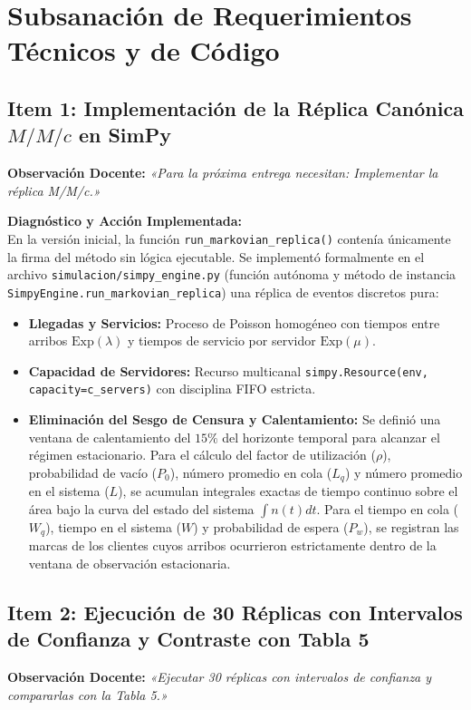 \documentclass[11pt,letterpaper]{article}
\begin{document}
\hrulefill

\section{Subsanación de Requerimientos Técnicos y de Código}

\subsection{Item 1: Implementación de la Réplica Canónica $M/M/c$ en SimPy}
\noindent \textbf{Observación Docente:} \textit{«Para la próxima entrega necesitan: Implementar la réplica M/M/c.»}

\vspace{0.4em}
\noindent \textbf{Diagnóstico y Acción Implementada:} \\
En la versión inicial, la función \texttt{run\_markovian\_replica()} contenía únicamente la firma del método sin lógica ejecutable. Se implementó formalmente en el archivo \texttt{simulacion/simpy\_engine.py} (función autónoma y método de instancia \texttt{SimpyEngine.run\_markovian\_replica}) una réplica de eventos discretos pura:
\begin{itemize}[leftmargin=1.5em, itemsep=0.2em]
    \item \textbf{Llegadas y Servicios:} Proceso de Poisson homogéneo con tiempos entre arribos $\text{Exp}(\lambda)$ y tiempos de servicio por servidor $\text{Exp}(\mu)$.
    \item \textbf{Capacidad de Servidores:} Recurso multicanal \texttt{simpy.Resource(env, capacity=c\_servers)} con disciplina FIFO estricta.
    \item \textbf{Eliminación del Sesgo de Censura y Calentamiento:} Se definió una ventana de calentamiento del $15\%$ del horizonte temporal para alcanzar el régimen estacionario. Para el cálculo del factor de utilización ($\rho$), probabilidad de vacío ($P_0$), número promedio en cola ($L_q$) y número promedio en el sistema ($L$), se acumulan integrales exactas de tiempo continuo sobre el área bajo la curva del estado del sistema $\int n(t)dt$. Para el tiempo en cola ($W_q$), tiempo en el sistema ($W$) y probabilidad de espera ($P_w$), se registran las marcas de los clientes cuyos arribos ocurrieron estrictamente dentro de la ventana de observación estacionaria.
\end{itemize}

\subsection{Item 2: Ejecución de 30 Réplicas con Intervalos de Confianza y Contraste con Tabla 5}
\noindent \textbf{Observación Docente:} \textit{«Ejecutar 30 réplicas con intervalos de confianza y compararlas con la Tabla 5.»}
\end{document}
